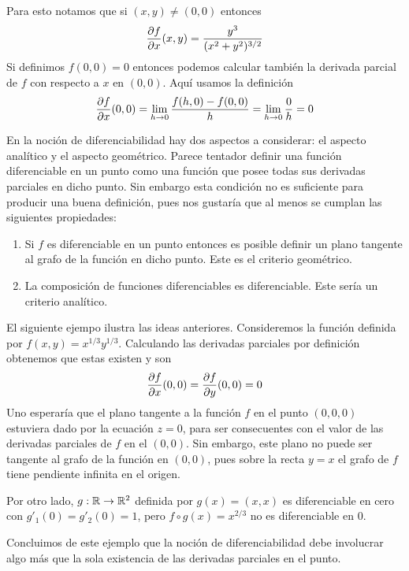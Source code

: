 \begin{solucion}
Para esto notamos que si $(x,y)\neq(0,0)$ entonces 
$$\frac{\partial f}{\partial x}(x,y)=\frac{y^3}{(x^2+y^2)^{3/2}}$$
Si definimos $f(0,0)=0$ entonces podemos calcular tambi\'en la derivada parcial
de $f$ con respecto a $x$ en $(0,0)$. Aqu\'i usamos la definici\'on
$$\frac{\partial f}{\partial x}(0,0)=\lim_{h\to 0}\frac{f(h,0)-f(0,0)}{h}=\lim_{h\to 0}\frac{0}{h}=0$$
\end{solucion}

En la noci\'on de diferenciabilidad hay dos aspectos a considerar:
el aspecto anal\'itico y el aspecto
 geom\'etrico.
Parece tentador definir una funci\'on diferenciable en un punto como una  
funci\'on
que posee  todas sus derivadas parciales en dicho punto. Sin embargo 
esta condici\'on no es suficiente para producir una buena definici\'on, 
 pues nos gustar\'ia que al menos se cumplan las siguientes
propiedades:
\begin{enumerate}
\item Si $f$ es diferenciable en un punto entonces es posible definir un plano 
tangente al grafo de la funci\'on en dicho punto. Este es el criterio
geom\'etrico.
\item La composici\'on de funciones diferenciables 
es diferenciable. Este ser\'ia un criterio  anal\'itico.
\end{enumerate}

\begin{ejemplo}\label{diferenciabilidad-1} 
El siguiente ejempo ilustra las ideas anteriores.
Consideremos la funci\'on definida por $f(x,y)=x^{1/3}y^{1/3}$. 
Calculando las derivadas parciales por definici\'on obtenemos que estas existen 
y son
$$\frac{\partial f}{\partial x}(0,0)=\frac{\partial f}{\partial y}(0,0)=0$$  
Uno esperar\'ia que el plano tangente a la funci\'on $f$
en el punto $(0,0,0)$ estuviera dado por la ecuaci\'on $z=0$, para ser consecuentes
con el valor de las derivadas parciales de $f$ en el $(0,0)$. Sin embargo,
este plano no puede ser tangente al  grafo de la funci\'on en $(0,0)$, 
pues sobre la recta $y=x$ el grafo de $f$ tiene pendiente infinita en el origen.

Por otro lado, $g:\mathbb{R}\to\mathbb{R}^2$ definida por $g(x)=(x,x)$ 
es diferenciable en cero con $g'_1(0)=g'_2(0)=1$, pero 
$f\circ g(x)=x^{2/3}$ no es diferenciable en 0.
\end{ejemplo}

Concluimos de este ejemplo que la noci\'on de diferenciabilidad debe 
involucrar algo m\'as que la sola existencia de las 
derivadas parciales en el punto.

